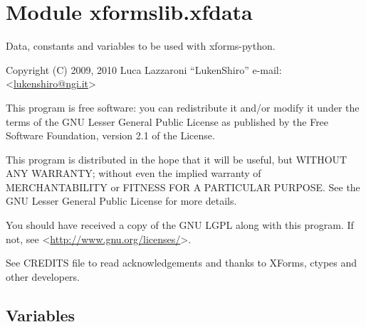 %
%
%


\section{Module xformslib.xfdata}

    \label{xformslib:xfdata}

Data, constants and variables to be used with xforms-python.

Copyright (C) 2009, 2010  Luca Lazzaroni ``LukenShiro''
e-mail: <\href{mailto:lukenshiro@ngi.it}{lukenshiro@ngi.it}>

This program is free software: you can redistribute it and/or modify
it under the terms of the GNU Lesser General Public License as
published by the Free Software Foundation, version 2.1 of the License.

This program is distributed in the hope that it will be useful,
but WITHOUT ANY WARRANTY; without even the implied warranty of
MERCHANTABILITY or FITNESS FOR A PARTICULAR PURPOSE. See the
GNU Lesser General Public License for more details.

You should have received a copy of the GNU LGPL along with this
program. If not, see <\href{http://www.gnu.org/licenses/}{http://www.gnu.org/licenses/}>.

See CREDITS file to read acknowledgements and thanks to XForms,
ctypes and other developers.


  \subsection{Variables}

